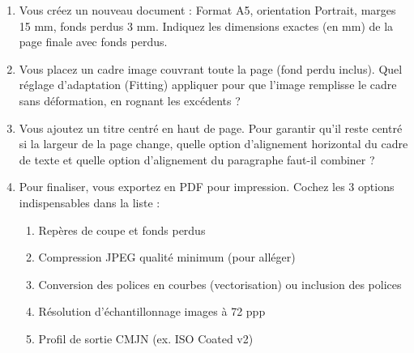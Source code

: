 \documentclass[11pt]{article}
\begin{document}
\begin{exercice}
\begin{enumerate}
    \item Vous créez un nouveau document : Format A5, orientation Portrait, marges 15 mm, fonds perdus 3 mm. Indiquez les dimensions exactes (en mm) de la page finale avec fonds perdus.
    \item Vous placez un cadre image couvrant toute la page (fond perdu inclus). Quel réglage d'adaptation (Fitting) appliquer pour que l'image remplisse le cadre sans déformation, en rognant les excédents ?
    \item Vous ajoutez un titre centré en haut de page. Pour garantir qu'il reste centré si la largeur de la page change, quelle option d'alignement horizontal du cadre de texte et quelle option d'alignement du paragraphe faut-il combiner ?
    \item Pour finaliser, vous exportez en PDF pour impression. Cochez les 3 options indispensables dans la liste :
    \begin{enumerate}
        \item Repères de coupe et fonds perdus
        \item Compression JPEG qualité minimum (pour alléger)
        \item Conversion des polices en courbes (vectorisation) ou inclusion des polices
        \item Résolution d'échantillonnage images à 72 ppp
        \item Profil de sortie CMJN (ex. ISO Coated v2)
    \end{enumerate}
\end{enumerate}
\end{exercice}
\end{document}
